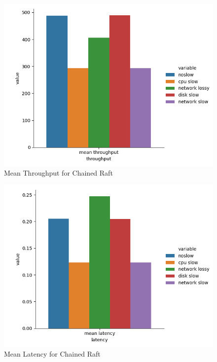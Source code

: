 \begin{figure}[h!]
    \includegraphics[width=\linewidth]{chained_mean_throughput.png}
    \caption{Mean Throughput for Chained Raft}
    \label{fig:chain_thput}
\end{figure}
\begin{figure}[h!]
    \includegraphics[width=\linewidth]{chained_mean_latency.png}
    \caption{Mean Latency for Chained Raft}
    \label{fig:chain_lat}
\end{figure}

